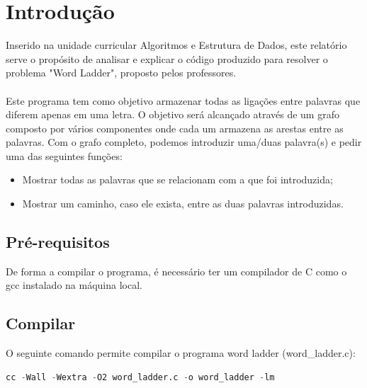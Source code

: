 	

	



	\renewcommand{\contentsname}{\'Indice} %
	\tableofcontents %
	\listoffigures 


\pagestyle{fancy}
\fancyhf{}
\rhead{\titulo}
\cfoot{\thepage}

\chapter{Introdução}
\label{introduçao}
    Inserido na unidade curricular Algoritmos e Estrutura de Dados, este relatório serve o propósito de analisar e explicar o código produzido para resolver o problema "Word Ladder", proposto pelos professores.
    \\\\
    Este programa tem como objetivo armazenar todas as ligações entre palavras que diferem apenas em uma letra. O objetivo será alcançado através de um grafo composto por vários componentes 
onde cada um armazena as arestas entre as palavras. Com o grafo completo, podemos introduzir uma/duas palavra(s)
e pedir uma das seguintes funções: 
\begin{itemize}
\item Mostrar todas as palavras que se relacionam com a que foi introduzida;
\item Mostrar um caminho, caso ele exista, entre as duas palavras introduzidas.
\end{itemize}

	\section{Pré-requisitos}
	\label{requisitos}
	De forma a compilar o programa, é necessário ter um compilador de C como o gcc instalado na máquina local.
	
	\section{Compilar}
	\label{compilar}
	O seguinte comando permite compilar o programa word ladder (word\_ladder.c):
	\begin{lstlisting}[language=python]
  cc -Wall -Wextra -O2 word_ladder.c -o word_ladder -lm
    \end{lstlisting}
	
